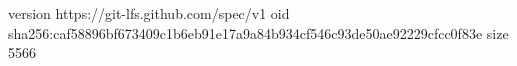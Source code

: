 version https://git-lfs.github.com/spec/v1
oid sha256:caf58896bf673409c1b6eb91e17a9a84b934cf546c93de50ae92229cfcc0f83e
size 5566
